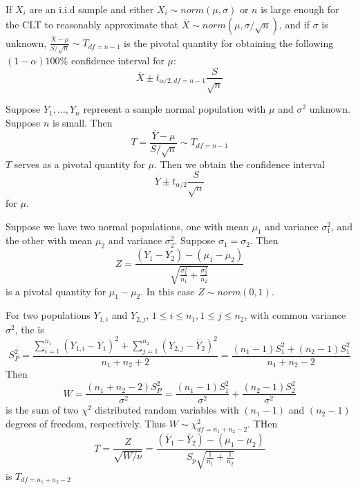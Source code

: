 \documentclass[12pt, a4paper, twoside, openright, titlepage]{book}
\begin{document}
\begin{prop}{}{}
    If $X_i$ are an i.i.d sample and either $X_i \sim norm(\mu, \sigma)$ or $n$ is large enough for the CLT to reasonably approximate that $\overline{X} \sim norm(\mu,\sigma/\sqrt{n})$, and if $\sigma$ is unknown, $\frac{\overline{X}-\mu}{S/\sqrt{n}} \sim T_{df = n-1}$ is the pivotal quantity for obtaining the following $(1-\alpha)100\%$ confidence interval for $\mu$:\begin{equation*}
        \overline{X}\pm t_{\alpha/2,df = n-1}\frac{S}{\sqrt{n}}
    \end{equation*}
\end{prop}

\begin{rmk}{}{}
    Suppose $Y_1,...,Y_n$ represent a sample normal population with $\mu$ and $\sigma^2$ unknown. Suppose $n$ is small. Then \begin{equation*}
        T = \frac{\overline{Y}-\mu}{S/\sqrt{n}}\sim T_{df = n-1}
    \end{equation*}
    $T$ serves as a pivotal quantity for $\mu$. Then we obtain the confidence interval \begin{equation*}
        \overline{Y} \pm t_{\alpha/2}\frac{S}{\sqrt{n}}
    \end{equation*}
    for $\mu$.
\end{rmk}

\begin{rmk}{}{}
    Suppose we have two normal populations, one with mean $\mu_1$ and variance $\sigma_1^2$, and the other with mean $\mu_2$ and variance $\sigma_2^2$. Suppose $\sigma_1 = \sigma_2$. Then \begin{equation*}
        Z = \frac{(\overline{Y}_1 - \overline{Y}_2) - (\mu_1 - \mu_2)}{\sqrt{\frac{\sigma_1^2}{n_1} + \frac{\sigma_2^2}{n_2}}}
    \end{equation*}
    is a pivotal quantity for $\mu_1 - \mu_2$. In this case $Z \sim norm(0,1)$.
\end{rmk}

\begin{defn}{}{}
    For two populations $Y_{1,i}$ and $Y_{2,j}$, $1 \leq i \leq n_1, 1 \leq j \leq n_2$, with common variance $\sigma^2$, the  is \begin{equation*}
        S_P^2 = \frac{\sum_{i=1}^{n_1}(Y_{1,i}-\overline{Y}_1)^2 + \sum_{j=1}^{n_2}(Y_{2,j}-\overline{Y}_2)^2}{n_1+n_2+2} = \frac{(n_1-1)S_1^2 + (n_2-1)S_1^2}{n_1+n_2-2}
    \end{equation*}
    Then \begin{equation*}
        W = \frac{(n_1+n_2-2)S_P^2}{\sigma^2} = \frac{(n_1-1)S_1^2}{\sigma^2} + \frac{(n_2-1)S_2^2}{\sigma^2}
    \end{equation*}
    is the sum of two $\chi^2$ distributed random variables with $(n_1-1)$ and $(n_2-1)$ degrees of freedom, respectively. Thus $W \sim \chi^2_{df = n_1+n_2-2}$. THen \begin{equation*}
        T = \frac{Z}{\sqrt{W/\nu}} = \frac{(\overline{Y}_1-\overline{Y}_2)-(\mu_1-\mu_2)}{S_p\sqrt{\frac{1}{n_1}+\frac{1}{n_2}}}
    \end{equation*}
    is $T_{df = n_1+n_2 - 2}$
\end{defn}
\end{document}
